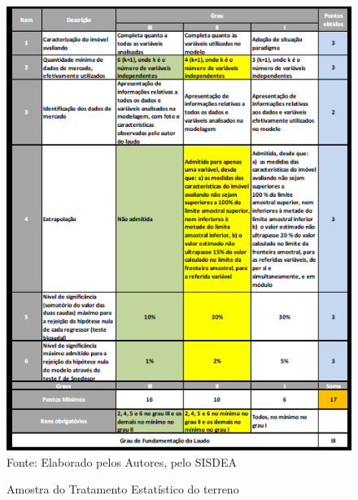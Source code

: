 \begin{figure}[H]
	\centering  \small 		\caption{ Amostra do Tratamento Estatístico do terreno}
	\includegraphics[width=0.947\linewidth]{figura/screenshot038}
	\label{fig:screenshot038}\\{ Fonte: Elaborado pelos Autores, pelo SISDEA}
\end{figure}
